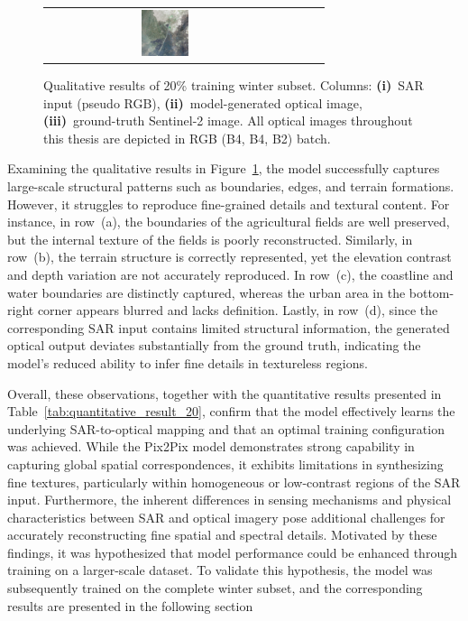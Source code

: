 \begin{figure}[h!]
\begin{tabular}{c *{3}{c}}
        \includegraphics[width=0.2\textwidth, height=0.2\textheight, keepaspectratio]{img/qualitative-20/sample_7/gt.png} \\
    \end{tabular}

    \caption[Qualitative results of 20\% training winter subset]{%
    Qualitative results of 20\% training winter subset.
    Columns: 
    \textbf{(i)}~SAR input (pseudo RGB), 
    \textbf{(ii)}~model-generated optical image, 
    \textbf{(iii)}~ground-truth Sentinel-2 image. All optical images throughout this thesis are depicted in RGB (B4, B4, B2) batch.}
    \label{fig:qualitative_results_20}
\end{figure}

Examining the qualitative results in Figure~\ref{fig:qualitative_results_20}, the model successfully captures large-scale structural patterns such as boundaries, edges, and terrain formations. However, it struggles to reproduce fine-grained details and textural content. For instance, in row~(a), the boundaries of the agricultural fields are well preserved, but the internal texture of the fields is poorly reconstructed. Similarly, in row~(b), the terrain structure is correctly represented, yet the elevation contrast and depth variation are not accurately reproduced. In row~(c), the coastline and water boundaries are distinctly captured, whereas the urban area in the bottom-right corner appears blurred and lacks definition. Lastly, in row~(d), since the corresponding SAR input contains limited structural information, the generated optical output deviates substantially from the ground truth, indicating the model’s reduced ability to infer fine details in textureless regions.


Overall, these observations, together with the quantitative results presented in Table~\ref{tab:quantitative_result_20}, confirm that the model effectively learns the underlying SAR-to-optical mapping and that an optimal training configuration was achieved. While the Pix2Pix model demonstrates strong capability in capturing global spatial correspondences, it exhibits limitations in synthesizing fine textures, particularly within homogeneous or low-contrast regions of the SAR input. Furthermore, the inherent differences in sensing mechanisms and physical characteristics between SAR and optical imagery pose additional challenges for accurately reconstructing fine spatial and spectral details. Motivated by these findings, it was hypothesized that model performance could be enhanced through training on a larger-scale dataset. To validate this hypothesis, the model was subsequently trained on the complete winter subset, and the corresponding results are presented in the following section

